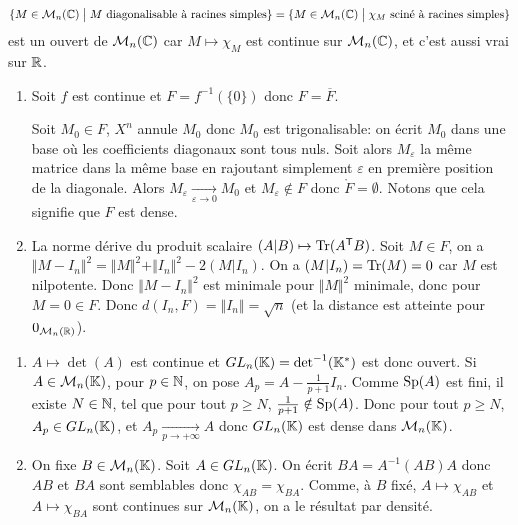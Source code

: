 \begin{remark}
	$$\{M\in\mathcal{M}_{n}(\mathbb{C})\bigm|M\text{ diagonalisable à racines simples}\}=\{M\in\mathcal{M}_{n}(\mathbb{C})\bigm|\chi_M\text{ sciné à racines simples}\}$$
	est un ouvert de $\mathcal{M}_{n}(\mathbb{C})$ car $M\mapsto\chi_{M}$ est continue sur $\mathcal{M}_{n}(\mathbb{C})$, et c'est aussi vrai sur $\mathbb{R}$.
\end{remark}

\begin{solution}
	\phantom{}
	\begin{enumerate}
		\item Soit 
		$f$ est continue et $F=f^{-1}(\{0\})$ donc $F=\overline{F}$.

		Soit $M_{0}\in F$, $X^{n}$ annule $M_{0}$ donc $M_{0}$ est trigonalisable: on écrit $M_{0}$ dans une base où les coefficients diagonaux sont tous nuls. Soit alors $M_{\varepsilon}$ la même matrice dans la même base en rajoutant simplement $\varepsilon$ en première position de la diagonale. Alors $M_{\varepsilon}\xrightarrow[\varepsilon\to0]{}M_{0}$ et $M_{\varepsilon}\notin F$ donc $\mathring{F}=\emptyset$. Notons que cela signifie que $F$ est dense.

		\item La norme dérive du produit scalaire $(A|B)\mapsto\operatorname{Tr}(A^{\mathsf{T}}B)$. Soit $M\in F$, on a $\Vert M-I_{n}\Vert^{2}=\Vert M\Vert^{2}+\Vert I_{n}\Vert^{2}-2(M|I_{n})$. On a $(M|I_{n})=\operatorname{Tr}(M)=0$ car $M$ est nilpotente. Donc $\Vert M-I_{n}\Vert^{2}$ est minimale pour $\Vert M\Vert^{2}$ minimale, donc pour $M=0\in F$. Donc $d(I_{n},F)=\Vert I_{n}\Vert=\sqrt{n}$ (et la distance est atteinte pour $0_{\mathcal{M}_n(\mathbb{R})}$).
	\end{enumerate}
\end{solution}

\begin{solution}
	\phantom{}
	\begin{enumerate}
		\item $A\mapsto\det(A)$ est continue et $GL_{n}(\mathbb{K})=\det^{-1}(\mathbb{K}^{*})$ est donc ouvert. Si $A\in\mathcal{M}_{n}(\mathbb{K})$, pour $p\in\mathbb{N}$, on pose $A_{p}=A-\frac{1}{p+1}I_{n}$. Comme $\operatorname{Sp}(A)$ est fini, il existe $N\in\mathbb{N}$, tel que pour tout $p\geqslant N$, $\frac{1}{p+1}\notin\operatorname{Sp}(A)$. Donc pour tout $p\geqslant N$, $A_{p}\in GL_{n}(\mathbb{K})$, et $A_{p}\xrightarrow[p\to+\infty]{}A$ donc $GL_{n}(\mathbb{K})$ est dense dans $\mathcal{M}_{n}(\mathbb{K})$.
		\item On fixe $B\in\mathcal{M}_{n}(\mathbb{K})$. Soit $A\in GL_{n}(\mathbb{K})$. On écrit $BA=A^{-1}(AB)A$ donc $AB$ et $BA$ sont semblables donc $\chi_{AB}=\chi_{BA}$. Comme, à $B$ fixé, $A\mapsto\chi_{AB}$ et $A\mapsto\chi_{BA}$ sont continues sur $\mathcal{M}_{n}(\mathbb{K})$, on a le résultat par densité.
	\end{enumerate}
\end{solution}

